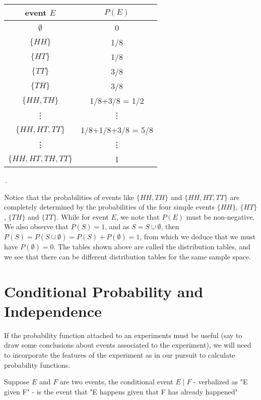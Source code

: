 \begin{ex}
\begin{center}
\begin{tabular}{|c|c|}
\hline \rowcolor{lightgray}
\textbf{event $E$} & $P(E)$\\
\hline
$\emptyset$ & 0 \\
\hline
$\{HH\}$ & 1/8\\
\hline
$\{HT\}$ & 1/8\\
\hline
$\{TT\}$ & 3/8\\
\hline
$\{TH\}$ & 3/8\\
\hline
$\{HH, TH\}$ & 1/8+3/8 = 1/2\\
\hline
\vdots & \vdots \\
\hline
$\{HH, HT, TT\}$ & 1/8+1/8+3/8 = 5/8\\
\hline 
\vdots & \vdots \\
\hline
$\{HH, HT, TH, TT\}$ & 1\\
\hline
\end{tabular}\,.
\end{center}
Notice that the probabilities of events like $\{HH, TH\}$ and $\{HH, HT, TT\}$ are completely determined by the probabilities of the four simple events $\{HH\}$, $\{HT\}$, $\{TH\}$ and $\{TT\}$. While for event $E$, we note that $P(E)$ must be non-negative. We also observe that $P(S) = 1$, and as $S = S\cup \emptyset$, then $P(S) = P(S\cup \emptyset) = P(S) + P(\emptyset) = 1$, from which we deduce that we must have $P(\emptyset) = 0$. The tables shown above are called the distribution tables, and we see that there can be different distribution tables for the same sample space. 
\end{ex}

\section{Conditional Probability and Independence}
If the probability function attached to an experiments must be useful (say to draw some conclusions about events associated to the experiment), we will need to incorporate the features of the experiment as in our pursuit to calculate probability functions. 

\begin{defn}
    Suppose $E$ and $F$ are two events, the conditional event $E\mid F$ - verbalized as "E given F" - is the event that "E happens given that F has already happened"
\end{defn}

